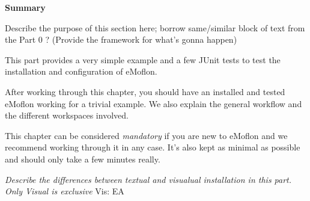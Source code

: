 \vspace*{2cm}

{\Huge \bfseries Summary}
\vspace{1cm}

Describe the purpose of this section here; borrow same/similar block of text from the Part 0 ?
(Provide the framework for what's gonna happen)

This part provides a very simple example and a few JUnit tests to test the installation and configuration of eMoflon.

After working through this chapter, you should have an installed and tested eMoflon working for a trivial example.
We also explain the general workflow and the different workspaces involved.

This chapter can be considered \emph{mandatory} if you are new to eMoflon and we recommend working through it in any case.
It's also kept as minimal as possible and should only take a few minutes really.

\large{\emph{Describe the differences between textual and visualual installation in this part. Only Visual is exclusive}}
Vis: EA

